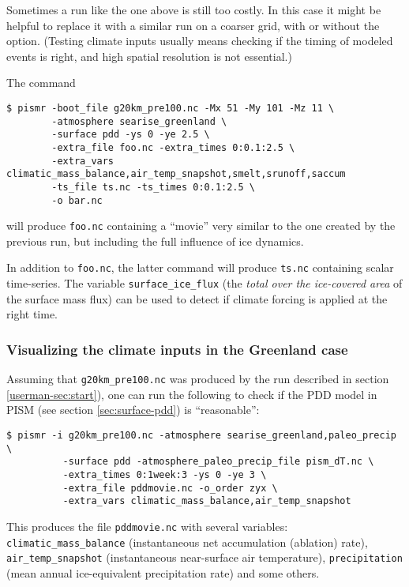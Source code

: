 \documentclass[titlepage,letterpaper,final]{scrartcl}
\begin{document}
Sometimes a run like the one above is still too costly. In this case it might be helpful to replace it with a similar run on a coarser grid, with or without the  option. (Testing climate inputs usually means checking if the timing of modeled events is right, and high spatial resolution is not essential.)

The command
\begin{verbatim}
$ pismr -boot_file g20km_pre100.nc -Mx 51 -My 101 -Mz 11 \
        -atmosphere searise_greenland \
        -surface pdd -ys 0 -ye 2.5 \
        -extra_file foo.nc -extra_times 0:0.1:2.5 \
        -extra_vars climatic_mass_balance,air_temp_snapshot,smelt,srunoff,saccum
        -ts_file ts.nc -ts_times 0:0.1:2.5 \
        -o bar.nc
\end{verbatim}%
will produce \texttt{foo.nc} containing a ``movie'' very similar to the one created by the previous run, but including the full influence of ice dynamics.

In addition to \texttt{foo.nc}, the latter command will produce \texttt{ts.nc} containing scalar time-series. The variable \texttt{surface_ice_flux} (the \emph{total over the ice-covered area} of the surface mass flux) can be used to detect if climate forcing is applied at the right time.

\subsubsection{Visualizing the climate inputs in the Greenland case}
\label{sec:pdd-series}

Assuming that \texttt{g20km_pre100.nc} was produced by the run described in section
\ref{userman-sec:start}), one can run the following to check if the PDD
model in PISM (see section \ref{sec:surface-pdd}) is ``reasonable'':
\begin{verbatim}
$ pismr -i g20km_pre100.nc -atmosphere searise_greenland,paleo_precip \
          -surface pdd -atmosphere_paleo_precip_file pism_dT.nc \
          -extra_times 0:1week:3 -ys 0 -ye 3 \
          -extra_file pddmovie.nc -o_order zyx \
          -extra_vars climatic_mass_balance,air_temp_snapshot
\end{verbatim}%
This produces the file \texttt{pddmovie.nc} with several variables: \texttt{climatic_mass_balance}
(instantaneous net accumulation (ablation) rate), \texttt{air_temp_snapshot}
(instantaneous near-surface air temperature), \texttt{precipitation} (mean annual
ice-equivalent precipitation rate) and some others.
\end{document}
